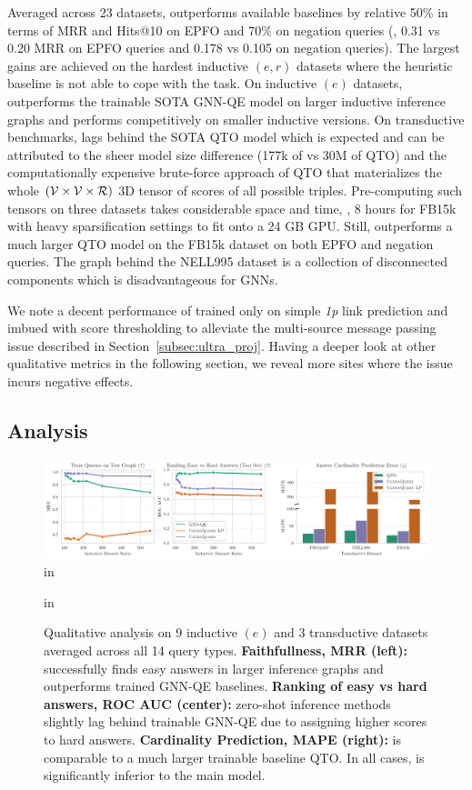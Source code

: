 Averaged across 23 datasets, \method outperforms available baselines by relative 50\% in terms of MRR and Hits@10 on EPFO and 70\% on negation queries (\eg, 0.31 vs 0.20 MRR on EPFO queries and 0.178 vs 0.105 on negation queries). 
The largest gains are achieved on the hardest inductive $(e,r)$ datasets where the heuristic baseline is not able to cope with the task. 
On inductive $(e)$ datasets, \method outperforms the trainable SOTA GNN-QE model on larger inductive inference graphs and performs competitively on smaller inductive versions. 
On transductive benchmarks, \method lags behind the SOTA QTO model which is expected and can be attributed to the sheer model size difference (177k of \method vs 30M of QTO) and the computationally expensive brute-force approach of QTO that materializes the whole $({\mathcal{V}} \times {\mathcal{V}} \times {\mathcal{R}})$ 3D tensor of scores of all possible triples. 
Pre-computing such tensors on three datasets takes considerable space and time, \eg, 8 hours for FB15k with heavy sparsification settings to fit onto a 24 GB GPU.
Still, \method outperforms a much larger QTO model on the FB15k dataset on both EPFO and negation queries.
The graph behind the NELL995 dataset is a collection of disconnected components which is disadvantageous for GNNs.

We note a decent performance of \methodlp trained only on simple \emph{1p} link prediction and imbued with score thresholding to alleviate the multi-source message passing issue described in Section~\ref{subsec:ultra_proj}.
Having a deeper look at other qualitative metrics in the following section, we reveal more sites where the issue incurs negative effects.


\subsection{Analysis}


\begin{figure}[t]
    \centering
    \includegraphics[width=\linewidth]{figs/qual_analysis_pyg.pdf}
     in
    \caption{Qualitative analysis on 9 inductive $(e)$ and 3 transductive datasets averaged across all 14 query types. \textbf{Faithfullness, MRR (left):} \method successfully finds easy answers in larger inference graphs and outperforms trained GNN-QE baselines. \textbf{Ranking of easy vs hard answers, ROC AUC (center):} zero-shot inference methods slightly lag behind trainable GNN-QE due to assigning higher scores to hard answers. \textbf{Cardinality Prediction, MAPE (right):} \method is comparable to a much larger trainable baseline QTO. In all cases, \methodlp is significantly inferior to the main model. }
    \label{fig:abl_quality}
     in
\end{figure}

